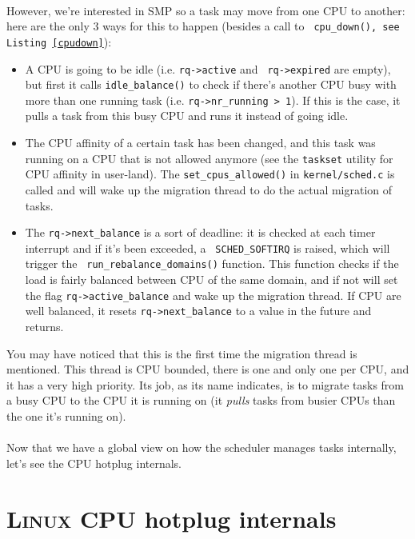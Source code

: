 \documentclass{report}
\renewcommand{\tt}[1]{\texttt{{{#1}}}}
\begin{document}
\paragraph{}
However, we're interested in SMP so a task may move from one CPU to another:
here are the only 3 ways for this to happen (besides a call to \tt{
  cpu\_down(), see Listing \ref{cpudown}}):
\begin{itemize}
  \item A CPU is going to be idle (i.e. \tt{rq->active} and \tt{
    rq->expired} are empty), but first it calls \tt{idle\_balance()} to
    check if there's another CPU busy with more than one running task
    (i.e. \tt{rq->nr\_running > 1}). If this is the case, it pulls
    a task from this busy CPU and runs it instead of going idle.
  \item The CPU affinity of a certain task has been changed, and this task was
    running on a CPU that is not allowed anymore (see the \tt{taskset}
    utility for CPU affinity in user-land). The \tt{set\_cpus\_allowed()}
    in \tt{kernel/sched.c} is called and will wake up the migration thread
    to do the actual migration of tasks.
  \item The \tt{rq->next\_balance} is a sort of deadline: it is checked at each
    timer interrupt and if it's been exceeded, a \tt{ SCHED\_SOFTIRQ} is
    raised, which will trigger the \tt{ run\_rebalance\_domains()}
    function. This function checks if the load is fairly balanced between CPU
    of the same domain, and if not will set the flag \tt{rq->active\_balance}
    and wake up the migration thread. If CPU are well balanced, it resets
    \tt{rq->next\_balance} to a value in the future and returns.
\end{itemize}

You may have noticed that this is the first time the migration thread is
mentioned. This thread is CPU bounded, there is one and only one per CPU, and
it has a very high priority. Its job, as its name indicates, is to migrate
tasks from a busy CPU to the CPU it is running on (it {\em pulls} tasks from
busier CPUs than the one it's running on).

\paragraph{}
Now that we have a global view on how the scheduler manages tasks internally,
let's see the CPU hotplug internals.

\section{\textsc{Linux} CPU hotplug internals}
\end{document}
